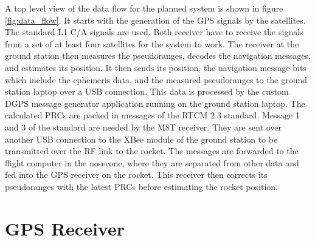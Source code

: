 A top level view of the data flow for the planned system is shown in figure \ref{fig:data_flow}.
It starts with the generation of the GPS signals by the satellites.
The standard L1 C/A signals are used.
Both receiver have to receive the signals from a set of at least four satellites for the system to work.
The receiver at the ground station then measures the pseudoranges, decodes the navigation messages, and estimates its position.
It then sends its position, the navigation message bits which include the ephemeris data, and the measured pseudoranges to the ground station laptop over a USB connection.
This data is processed by the custom DGPS message generator application running on the ground station laptop.
The calculated PRCs are packed in messages of the RTCM 2.3 standard.
Message 1 and 3 of the standard are needed by the M8T receiver.
They are sent over another USB connection to the XBee module of the ground station to be transmitted over the RF link to the rocket.
The messages are forwarded to the flight computer in the nosecone, where they are separated from other data and fed into the GPS receiver on the rocket.
This receiver then corrects its pseudoranges with the latest PRCs before estimating the rocket position.

\section{GPS Receiver}\label{sec:receiver}

